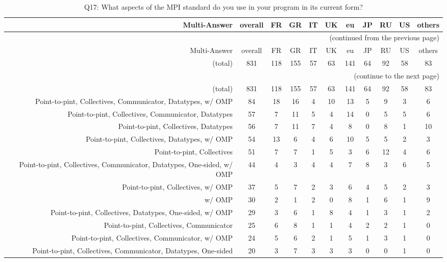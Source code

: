 \clearpage%
{\footnotesize\begin{landscape}%
\begin{longtable}[htb]{r|c|c|c|c|c|c|c|c|c|c}%
\caption{Q17: What aspects of the MPI standard do you use in your program in its current form?}%
\label{tab:Q17-mans} \\%
\hline%
Multi-Answer & overall & FR & GR & IT & UK & eu & JP & RU & US & others \\
 \hline%
\endfirsthead%
\multicolumn{11}{r}{(continued from the previous page)}\\%
\hline%
Multi-Answer & overall & FR & GR & IT & UK & eu & JP & RU & US & others \\
 \hline%
\endhead%
\hline%
(total) & 831 & 118 & 155 & 57 & 63 & 141 & 64 & 92 & 58 & 83 \\%
\hline%
\multicolumn{11}{r}{(continue to the next page)}\\%
\endfoot%
\hline%
(total) & 831 & 118 & 155 & 57 & 63 & 141 & 64 & 92 & 58 & 83 \\%
\hline%
\endlastfoot%
\hline%
{Point-to-pint, Collectives, Communicator, Datatypes, w/ OMP} & 84 & 18 & 16 & 4 & 10 & 13 & 5 & 9 & 3 & 6 \\%
{Point-to-pint, Collectives, Communicator, Datatypes} & 57 & 7 & 11 & 5 & 4 & 14 & 0 & 5 & 5 & 6 \\%
{Point-to-pint, Collectives, Datatypes} & 56 & 7 & 11 & 7 & 4 & 8 & 0 & 8 & 1 & 10 \\%
{Point-to-pint, Collectives, Datatypes, w/ OMP} & 54 & 13 & 6 & 4 & 6 & 10 & 5 & 5 & 2 & 3 \\%
{Point-to-pint, Collectives} & 51 & 7 & 7 & 1 & 5 & 3 & 6 & 12 & 4 & 6 \\%
{Point-to-pint, Collectives, Communicator, Datatypes, One-sided, w/ OMP} & 44 & 4 & 3 & 4 & 4 & 7 & 8 & 3 & 6 & 5 \\%
{Point-to-pint, Collectives, w/ OMP} & 37 & 5 & 7 & 2 & 3 & 6 & 4 & 5 & 2 & 3 \\%
{w/ OMP} & 30 & 2 & 1 & 2 & 0 & 8 & 1 & 6 & 1 & 9 \\%
{Point-to-pint, Collectives, Datatypes, One-sided, w/ OMP} & 29 & 3 & 6 & 1 & 8 & 4 & 1 & 3 & 1 & 2 \\%
{Point-to-pint, Collectives, Communicator} & 25 & 6 & 8 & 1 & 1 & 4 & 2 & 2 & 1 & 0 \\%
{Point-to-pint, Collectives, Communicator, w/ OMP} & 24 & 5 & 6 & 2 & 1 & 5 & 1 & 3 & 1 & 0 \\%
{Point-to-pint, Collectives, Communicator, Datatypes, One-sided} & 20 & 3 & 7 & 3 & 3 & 3 & 0 & 0 & 1 & 0 \\%

\end{longtable}
\end{landscape}}
